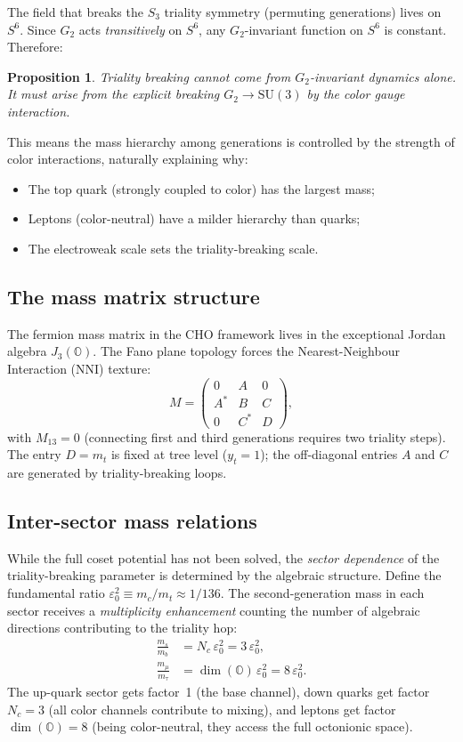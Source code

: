 \documentclass[12pt,a4paper]{article}
\newtheorem{proposition}[theorem]{Proposition}
\theoremstyle{definition}
\theoremstyle{remark}
\newcommand{\Oct}{\mathbb{O}}
\newcommand{\SU}{\mathrm{SU}}
\begin{document}
The field that breaks the $S_3$ triality symmetry (permuting generations) 
lives on $S^6$. Since $G_2$ acts \emph{transitively} on $S^6$, any 
$G_2$-invariant function on $S^6$ is constant. Therefore:

\begin{proposition}
Triality breaking cannot come from $G_2$-invariant dynamics alone. It must 
arise from the explicit breaking $G_2 \to \SU(3)$ by the color gauge 
interaction.
\end{proposition}

This means the mass hierarchy among generations is controlled by the 
strength of color interactions, naturally explaining why:
\begin{itemize}
\item The top quark (strongly coupled to color) has the largest mass;
\item Leptons (color-neutral) have a milder hierarchy than quarks;
\item The electroweak scale sets the triality-breaking scale.
\end{itemize}

\subsection{The mass matrix structure}

The fermion mass matrix in the CHO framework lives in the exceptional 
Jordan algebra $J_3(\Oct)$. The Fano plane topology forces the 
Nearest-Neighbour Interaction (NNI) texture:
\begin{equation}
M = \begin{pmatrix} 0 & A & 0 \\ A^* & B & C \\ 0 & C^* & D \end{pmatrix},
\end{equation}
with $M_{13} = 0$ (connecting first and third generations requires two 
triality steps). The entry $D = m_t$ is fixed at tree level ($y_t = 1$); 
the off-diagonal entries $A$ and $C$ are generated by triality-breaking 
loops.

\subsection{Inter-sector mass relations}

While the full coset potential has not been solved, the \emph{sector 
dependence} of the triality-breaking parameter is determined by the 
algebraic structure. Define the fundamental ratio 
$\varepsilon_0^2 \equiv m_c/m_t \approx 1/136$. The second-generation 
mass in each sector receives a \emph{multiplicity enhancement} counting 
the number of algebraic directions contributing to the triality hop:
\begin{align}
\frac{m_s}{m_b} &= N_c\, \varepsilon_0^2 = 3\,\varepsilon_0^2, \\
\frac{m_\mu}{m_\tau} &= \dim(\Oct)\, \varepsilon_0^2 = 8\,\varepsilon_0^2.
\end{align}
The up-quark sector gets factor~1 (the base channel), down quarks get 
factor $N_c = 3$ (all color channels contribute to mixing), and leptons 
get factor $\dim(\Oct) = 8$ (being color-neutral, they access the full 
octonionic space).
\end{document}
